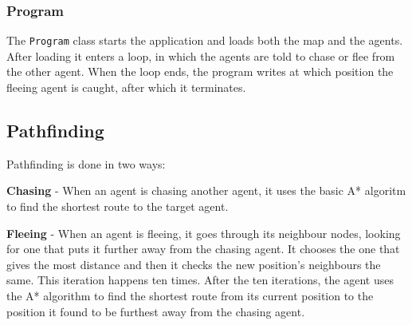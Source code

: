 \subsubsection{Program}
\label{03_01_05}
The \texttt{Program} class starts the application and loads both the map and the agents. After loading it enters a loop, in which the agents are told to chase or flee from the other agent. When the loop ends, the program writes at which position the fleeing agent is caught, after which it terminates.

\subsection{Pathfinding}
\label{03_02}

Pathfinding is done in two ways:

\begin{my_itemize}

	\item \textbf{Chasing} - When an agent is chasing another agent, it uses the basic A* algoritm to find the shortest route to the target agent.

	\item \textbf{Fleeing} - When an agent is fleeing, it goes through its neighbour nodes, looking for one that puts it further away from the chasing agent. It chooses the one that gives the most distance and then it checks the new position's neighbours the same. This iteration happens ten times. After the ten iterations, the agent uses the A* algorithm to find the shortest route from its current position to the position it found to be furthest away from the chasing agent.

\end{my_itemize}